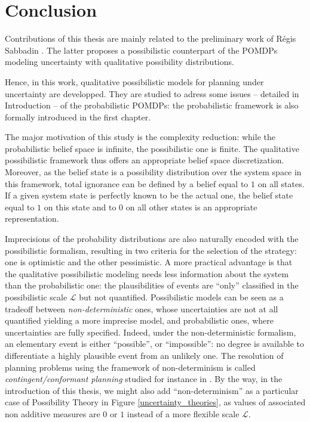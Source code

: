\chapter*{Conclusion}
Contributions of this thesis are
mainly related to the preliminary work 
of R\'egis Sabbadin \cite{Sabbadin:1999:pipomdp}.
The latter proposes 
a possibilistic counterpart 
of the POMDPs 
modeling uncertainty 
with qualitative possibility distributions.

Hence, in this work, 
qualitative possibilistic models 
for planning under uncertainty
are developped. 
They are studied 
to adress some issues -- detailed in Introduction --
of the probabilistic POMDPs: 
the probabilistic framework is also 
formally introduced 
in the first chapter.

The major motivation of this study 
is the complexity reduction: 
while the probabilistic belief space is infinite,
the possibilistic one is finite.
The qualitative possibilistic framework 
thus offers an appropriate 
belief space discretization.
Moreover, as the belief state 
is a possibility distribution 
over the system space in this framework, 
total ignorance can be defined 
by a belief equal to $1$ on all states.
If a given system state is perfectly known
to be the actual one, 
the belief state equal to $1$ on this state 
and to $0$ on all other states 
is an appropriate representation.

Imprecisions of the probability distributions
are also naturally encoded 
with the possibilistic formalism, 
resulting in two criteria
for the selection of the strategy:
one is optimistic 
and the other pessimistic.
A more practical advantage is that 
the qualitative possibilistic modeling 
needs less information about the system
than the probabilistic one:
the plausibilities of events 
are ``only'' classified 
in the possibilistic scale $\mathcal{L}$ 
but not quantified.
Possibilistic models can be seen 
as a tradeoff between \textit{non-deterministic} ones, 
whose uncertainties are not at all quantified 
yielding a more imprecise model, 
and probabilistic ones, 
where uncertainties are fully specified.
Indeed, under the non-deterministic formalism,
an elementary event is either ``possible'',
or ``impossible'':
no degree is available
to differentiate a highly plausible event 
from an unlikely one.
The resolution of planning problems 
using the framework of non-determinism 
is called \textit{contingent/conformant planning} 
studied for instance in \cite{Albore_atranslation-based}.
By the way, in the introduction of this thesis,
we might also add ``non-determinism''
as a particular case of Possibility Theory
in Figure \ref{uncertainty_theories},
as values of associated non additive measures
are $0$ or $1$ instead of a more flexible scale $\mathcal{L}$.

